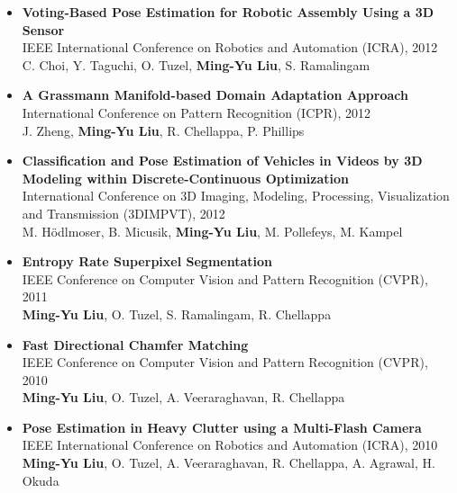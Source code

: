 \documentclass[10pt,letterpaper]{article}
\begin{document}
\begin{itemize}
\item           {\bf Voting-Based Pose Estimation for Robotic Assembly Using a 3D Sensor}\\
                IEEE International Conference on Robotics and Automation (ICRA), 2012\\
                C. Choi, Y. Taguchi, O. Tuzel, {\bf Ming-Yu Liu}, S. Ramalingam\vspace{-2mm}               

\item           {\bf A Grassmann Manifold-based Domain Adaptation Approach}\\
                International Conference on Pattern Recognition (ICPR), 2012\\
                J. Zheng, {\bf Ming-Yu Liu}, R. Chellappa, P. Phillips\vspace{-2mm}
                
\item           {\bf Classification and Pose Estimation of Vehicles in Videos by 3D Modeling within Discrete-Continuous Optimization}\\
                International Conference on 3D Imaging, Modeling, Processing, Visualization and Transmission (3DIMPVT), 2012\\
                M. Hödlmoser, B. Micusik, {\bf Ming-Yu Liu}, M. Pollefeys, M. Kampel\vspace{-2mm}

\item           {\bf Entropy Rate Superpixel Segmentation}\\
                IEEE Conference on Computer Vision and Pattern Recognition (CVPR), 2011\\
                {\bf Ming-Yu Liu}, O. Tuzel, S. Ramalingam, R. Chellappa\vspace{-2mm}
                
\item           {\bf Fast Directional Chamfer Matching}\\
                IEEE Conference on Computer Vision and Pattern Recognition (CVPR), 2010\\
                {\bf Ming-Yu Liu}, O. Tuzel, A. Veeraraghavan, R. Chellappa\vspace{-2mm}
                
\item           {\bf Pose Estimation in Heavy Clutter using a Multi-Flash Camera}\\
                IEEE International Conference on Robotics and Automation (ICRA), 2010\\
                {\bf Ming-Yu Liu}, O. Tuzel, A. Veeraraghavan, R. Chellappa, A. Agrawal, H. Okuda
\end{itemize}
\end{document}
